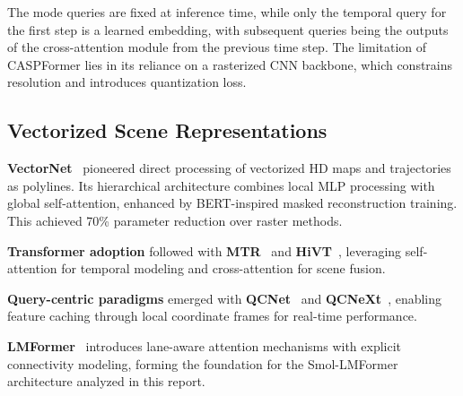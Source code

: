 The mode queries are fixed at inference time, while only the temporal query for the first step is a learned embedding, with subsequent queries being the outputs of the cross-attention module from the previous time step.
The  limitation of CASPFormer lies in its reliance on a rasterized CNN backbone, which constrains resolution and introduces quantization loss.

\subsection{Vectorized Scene Representations}
\textbf{VectorNet}~\cite{gao2020vectornet} pioneered direct processing of vectorized HD maps and trajectories as polylines. Its hierarchical architecture combines local MLP processing with global self-attention, enhanced by BERT-inspired masked reconstruction training. This achieved 70\% parameter reduction over raster methods.

\textbf{Transformer adoption} followed with \textbf{MTR}~\cite{shi2022motion} and \textbf{HiVT}~\cite{zhou2022hivt}, leveraging self-attention for temporal modeling and cross-attention for scene fusion.

\textbf{Query-centric paradigms} emerged with \textbf{QCNet}~\cite{qcnetZhou2023} and \textbf{QCNeXt}~\cite{qcnextZhou2023}, enabling feature caching through local coordinate frames for real-time performance.

\textbf{LMFormer}~\cite{lmformerYadav2025} introduces lane-aware attention mechanisms with explicit connectivity modeling, forming the foundation for the Smol-LMFormer architecture analyzed in this report.